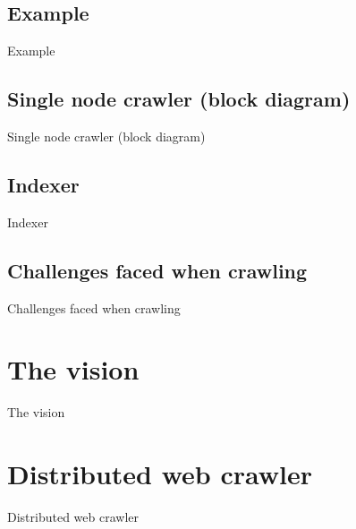 \documentclass[9pt]{beamer}
\begin{document}

\subsection{Example}
\begin{frame}{Example}
  
\end{frame}


\subsection{Single node crawler (block diagram)}
\begin{frame}{Single node crawler (block diagram)}
  
\end{frame}


\subsection{Indexer}
\begin{frame}{Indexer}
  
\end{frame}


\subsection{Challenges faced when crawling}
\begin{frame}{Challenges faced when crawling}
  
\end{frame}


\section{The vision}
\begin{frame}{The vision}
 
\end{frame}


\section{Distributed web crawler}
\begin{frame}{Distributed web crawler}

\end{frame}
\end{document}
